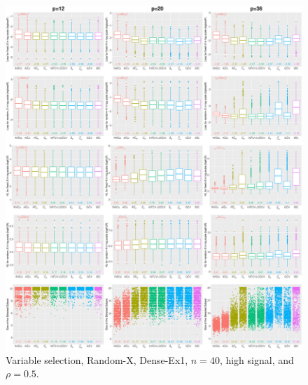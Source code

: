 \begin{figure}[!ht]
\centering
\includegraphics[width=\textwidth]{figures/supplement/randomx/subset_selection/Dense-Ex1_n40_hsnr_rho05.eps}
\caption{Variable selection, Random-X, Dense-Ex1, $n=40$, high signal, and $\rho=0.5$.}
\end{figure}
\clearpage
